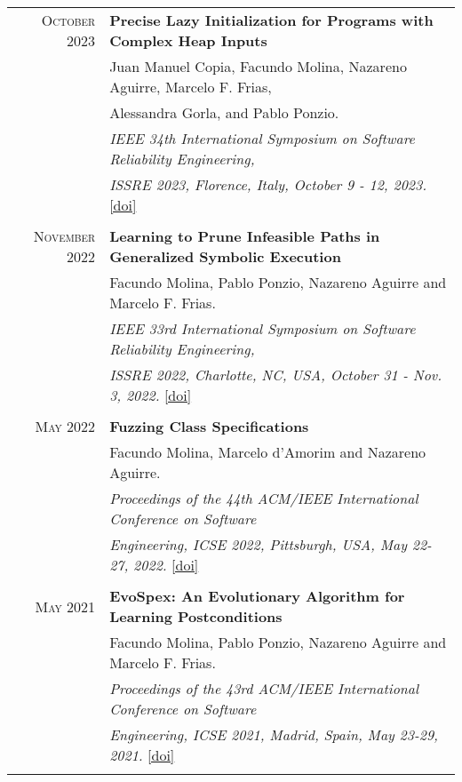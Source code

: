 \documentclass[a4paper,10pt]{article} %
\begin{document}
\begin{longtable}{rl}
\textsc{October} 2023  & \textbf{Precise Lazy Initialization for Programs with Complex Heap Inputs} \\
        & Juan Manuel Copia, Facundo Molina, Nazareno Aguirre, Marcelo F. Frias,\\
        & Alessandra Gorla, and Pablo Ponzio. \\
        & \textit{IEEE 34th International Symposium on Software Reliability Engineering,} \\
        & \textit{ISSRE 2023, Florence, Italy, October 9 - 12, 2023.} \href{https://doi.ieeecomputersociety.org/10.1109/ISSRE59848.2023.00080}{[doi]}\\ & \\

\textsc{November} 2022  & \textbf{Learning to Prune Infeasible Paths in Generalized Symbolic Execution} \\
        & Facundo Molina, Pablo Ponzio, Nazareno Aguirre and Marcelo F. Frias.\\
        & \textit{IEEE 33rd International Symposium on Software Reliability Engineering,} \\
        & \textit{ISSRE 2022, Charlotte, NC, USA, October 31 - Nov. 3, 2022.} \href{https://doi.org/10.1109/ISSRE55969.2022.00054}{[doi]} \\ & \\

\textsc{May} 2022  & \textbf{Fuzzing Class Specifications} \\
	& Facundo Molina, Marcelo d'Amorim and Nazareno Aguirre. \\
	& \textit{Proceedings of the 44th ACM/IEEE International Conference on Software} \\
	& \textit{Engineering, ICSE 2022, Pittsburgh, USA, May 22-27, 2022.} \href{https://dl.acm.org/doi/abs/10.1145/3510003.3510120}{[doi]}\\ & \\

\textsc{May} 2021  & \textbf{EvoSpex: An Evolutionary Algorithm for Learning Postconditions} \\
& Facundo Molina, Pablo Ponzio, Nazareno Aguirre and Marcelo F. Frias. \\
& \textit{Proceedings of the 43rd ACM/IEEE International Conference on Software} \\
& \textit{Engineering, ICSE 2021, Madrid, Spain, May 23-29, 2021.} \href{https://doi.ieeecomputersociety.org/10.1109/ICSE43902.2021.00112}{[doi]} \\ & \\



\end{longtable}
\end{document}
